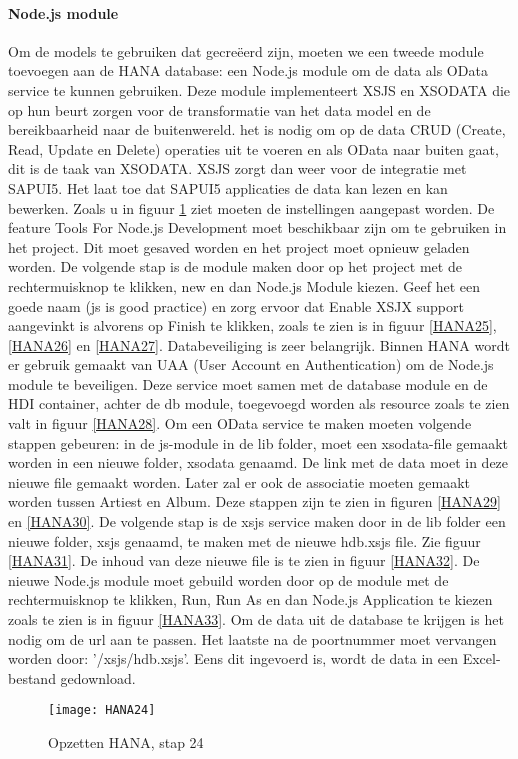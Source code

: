             \paragraph{Node.js module}
            Om de models te gebruiken dat gecreëerd zijn, moeten we een tweede module toevoegen aan de HANA database: een Node.js module om de data als OData service te kunnen gebruiken.
            Deze module implementeert XSJS en XSODATA die op hun beurt zorgen voor de transformatie van het data model en de bereikbaarheid naar de buitenwereld. het is nodig om op de data CRUD (Create, Read, Update en Delete) operaties uit te voeren en als OData naar buiten gaat, dit is de taak van XSODATA. XSJS zorgt dan weer voor de integratie met SAPUI5. Het laat toe dat SAPUI5 applicaties de data kan lezen en kan bewerken.
            Zoals u in figuur \ref{HANA24} ziet moeten de instellingen aangepast worden. De feature Tools For Node.js Development moet beschikbaar zijn om te gebruiken in het project. Dit moet gesaved worden en het project moet opnieuw geladen worden. De volgende stap is de module maken door op het project met de rechtermuisknop te klikken, new en dan Node.js Module kiezen. Geef het een goede naam (js is good practice) en zorg ervoor dat Enable XSJX support aangevinkt is alvorens op Finish te klikken, zoals te zien is in figuur \ref{HANA25}, \ref{HANA26} en \ref{HANA27}.
            Databeveiliging is zeer belangrijk. Binnen HANA wordt er gebruik gemaakt van UAA (User Account en Authentication) om de Node.js module te beveiligen. Deze service moet samen met de database module en de HDI container, achter de db module, toegevoegd worden als resource zoals te zien valt in figuur \ref{HANA28}.
            Om een OData service te maken moeten volgende stappen gebeuren: in de js-module in de lib folder, moet een xsodata-file gemaakt worden in een nieuwe folder, xsodata genaamd. De link met de data moet in deze nieuwe file gemaakt worden. Later zal er ook de associatie moeten gemaakt worden tussen Artiest en Album. Deze stappen zijn te zien in figuren \ref{HANA29} en \ref{HANA30}.
            De volgende stap is de xsjs service maken door in de lib folder een nieuwe folder, xsjs genaamd, te maken met de nieuwe hdb.xsjs file. Zie figuur \ref{HANA31}. De inhoud van deze nieuwe file is te zien in figuur \ref{HANA32}.
            De nieuwe Node.js module moet gebuild worden door op de module met de rechtermuisknop te klikken, Run, Run As en dan Node.js Application te kiezen zoals te zien is in figuur \ref{HANA33}.
            Om de data uit de database te krijgen is het nodig om de url aan te passen. Het laatste na de poortnummer moet vervangen worden door: '/xsjs/hdb.xsjs'. Eens dit ingevoerd is, wordt de data in een Excel-bestand gedownload.
            \begin{figure}	
                \centering
                \texttt{[image: HANA24]}
                \caption{Opzetten HANA, stap 24} \label{HANA24}
            \end{figure}
            
